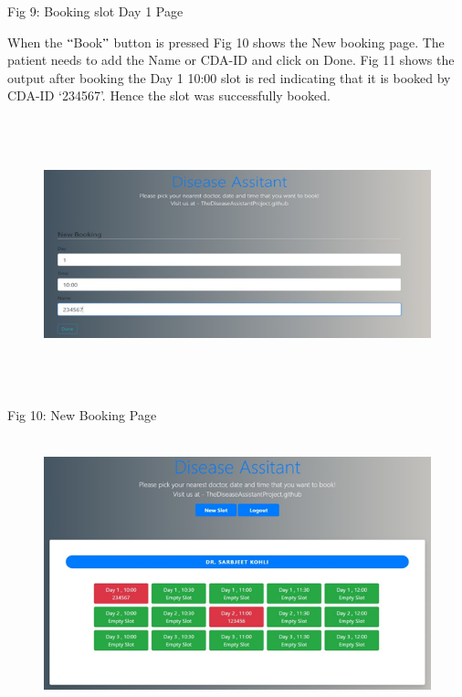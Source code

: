 \documentclass[12pt]{article}
\begin{document}

\begin{Center}
Fig 9: Booking slot Day 1 Page
\end{Center}
\begin{justify}
When the $``$Book$"$  button is pressed Fig 10 shows the New booking page. The patient needs to add the Name or CDA-ID and click on Done. Fig 11 shows the output after booking the Day 1 10:00 slot is red indicating that it is booked by CDA-ID ‘234567’. Hence the slot was successfully booked.
\end{justify}



\begin{figure}[H]
	\begin{Center}
		\includegraphics[width=6.3in,height=3.1in]{./media/image6.png}
	\end{Center}
\end{figure}


\begin{Center}
Fig 10: New Booking Page
\end{Center}



\begin{figure}[H]
	\begin{Center}
		\includegraphics[width=5.99in,height=3.1in]{./media/image3.png}
	\end{Center}
\end{figure}
\end{document}
